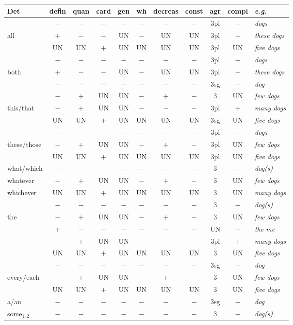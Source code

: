 \begin{table}
\centering
\begin{tabular}{|l||c|c|c|c|c|c|c|c|c||l|}
\hline
Det&defin&quan&card&gen&wh&decreas&const&agr&compl&{\it e.g.}\\
\hline
\hline
&$-$&$-$&$-$&$-$&$-$&$-$&$-$&3pl&$-$&{\it dogs}\\
all&$+$&$-$&$-$&UN&$-$&UN&UN&3pl&$-$&{\it these dogs}\\
&UN&UN&$+$&UN&UN&UN&UN&3pl&UN&{\it five dogs}\\
\hline
&$-$&$-$&$-$&$-$&$-$&$-$&$-$&3pl&$-$&{\it dogs}\\
{both}&$+$&$-$&$-$&UN&$-$&UN&UN&3pl&$-$&{\it these dogs}\\
\hline
&$-$&$-$&$-$&$-$&$-$&$-$&$-$&3sg&$-$&{\it dog}\\
&$-$&$+$&UN&UN&$-$&$+$&$-$&3&UN&{\it few dogs}\\
{this/that}&$-$&$+$&UN&UN&$-$&$-$&$-$&3pl&$+$&{\it many dogs}\\
&UN&UN&$+$&UN&UN&UN&UN&3sg&UN&{\it five dogs}\\
\hline
&$-$&$-$&$-$&$-$&$-$&$-$&$-$&3pl&$-$&{\it dogs}\\
these/those&$-$&$+$&UN&UN&$-$&$+$&$-$&3pl&UN&{\it few dogs}\\
&UN&UN&$+$&UN&UN&UN&UN&3pl&UN&{\it five dogs}\\
\hline
what/which&$-$&$-$&$-$&$-$&$-$&$-$&$-$&3&$-$&{\it dog(s)}\\
whatever&$-$&$+$&UN&UN&$-$&$+$&$-$&3&UN&{\it few dogs}\\
whichever&UN&UN&$+$&UN&UN&UN&UN&3&UN&{\it many dogs}\\
\hline
&$-$&$-$&$-$&$-$&$-$&$-$&$-$&3&$-$&{\it dog(s)}\\
the&$-$&$+$&UN&UN&$-$&$+$&$-$&3&UN&{\it few dogs}\\
&$+$&$-$&$-$&$-$&$-$&$-$&$-$&UN&$-$&{\it the me}\\
&$-$&$+$&UN&UN&$-$&$-$&$-$&3pl&$+$&{\it many dogs}\\
&UN&UN&$+$&UN&UN&UN&UN&3&UN&{\it five dogs}\\
\hline
&$-$&$-$&$-$&$-$&$-$&$-$&$-$&3sg&$-$&{\it dog}\\
every/each&$-$&$+$&UN&UN&$-$&$+$&$-$&3&UN&{\it few dogs}\\
&UN&UN&$+$&UN&UN&UN&UN&3&UN&{\it five dogs}\\
\hline
a/an&$-$&$-$&$-$&$-$&$-$&$-$&$-$&3sg&$-$&{\it dog}\\
\hline
some$_{1,2}$&$-$&$-$&$-$&$-$&$-$&$-$&$-$&3&$-$&{\it dog(s)}\\

\end{tabular}
\end{table}
